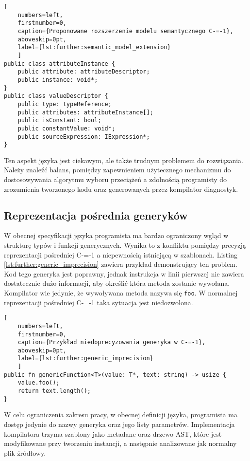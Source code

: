 \begin{minipage}{\textwidth}
	
\begin{lstlisting}[
	numbers=left,
	firstnumber=0,
	caption={Proponowane rozszerzenie modelu semantycznego C-=-1},
	aboveskip=0pt,
	label={lst:further:semantic_model_extension}
	]
public class attributeInstance {
	public attribute: attributeDescriptor;
	public instance: void*;
}
public class valueDescriptor {
	public type: typeReference;
	public attributes: attributeInstance[];
	public isConstant: bool;
	public constantValue: void*;
	public sourceExpression: IExpression*;
}
\end{lstlisting}
	
\end{minipage}

Ten aspekt języka jest ciekawym, ale także trudnym problemem do rozwiązania.
Należy znaleźć balans, pomiędzy zapewnieniem użytecznego mechanizmu do dostosowywania algorytmu wyboru przeciążeń a zdolnością programisty do zrozumienia tworzonego kodu oraz generowanych przez kompilator diagnostyk.

\subsection{Reprezentacja pośrednia generyków}
\label{further:generic_intermidiate_representation}

W obecnej specyfikacji języka programista ma bardzo ograniczony wgląd w strukturę typów i funkcji generycznych.
Wynika to z konfliktu pomiędzy precyzją reprezentacji pośredniej C-=-1 a niepewnością istniejącą w szablonach.
Listing \ref{lst:further:generic_imprecision} zawiera przykład demonstrujący ten problem.
Kod tego generyka jest poprawny, jednak instrukcja w linii pierwszej nie zawiera dostatecznie dużo informacji, aby określić która metoda zostanie wywołana.
Kompilator wie jedynie, że wywoływana metoda nazywa się \lstinline{foo}.
W normalnej reprezentacji pośredniej C-=-1 taka sytuacja jest niedozwolona.
\begin{lstlisting}[
	numbers=left,
	firstnumber=0,
	caption={Przykład niedoprecyzowania generyka w C-=-1},
	aboveskip=0pt,
	label={lst:further:generic_imprecision}
	]
public fn genericFunction<T>(value: T*, text: string) -> usize {
	value.foo();
	return text.length();
}

\end{lstlisting}

W celu ograniczenia zakresu pracy, w obecnej definicji języka, programista ma dostęp jedynie do nazwy generyka oraz jego listy parametrów.
Implementacja kompilatora trzyma szablony jako metadane oraz drzewo AST, które jest modyfikowane przy tworzeniu instancji, a następnie analizowane jak normalny plik źródłowy.

